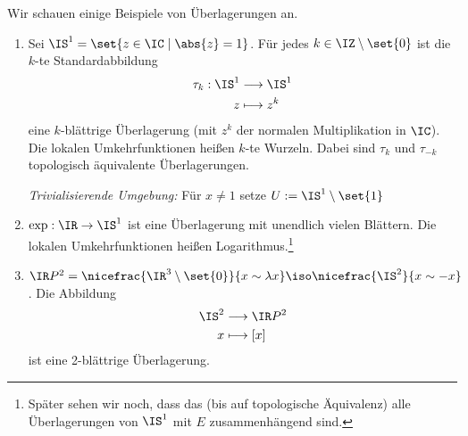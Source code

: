 \documentclass[language=ngerman]{TemplateLecture} %
\begin{document}
\begin{example}
    Wir schauen einige Beispiele von Überlagerungen an.
    \begin{enumerate}[$(a)$]
        \item Sei $\IS^1 = \set{z \in \IC \mid \abs{z} = 1}$. Für jedes $k \in \IZ \setminus \set{0}$ ist die $k$-te Standardabbildung
        \begin{align*}
            \tau_k: \IS^1 &\longrightarrow \IS^1\\
            z &\longmapsto z^k
        \end{align*}
        eine $k$-blättrige Überlagerung (mit $z^k$ der normalen Multiplikation in $\IC$). Die lokalen Umkehrfunktionen heißen $k$-te Wurzeln. Dabei sind $\tau_k$ und $\tau_{-k}$ topologisch äquivalente Überlagerungen.

        \emph{Trivialisierende Umgebung:} Für $x \neq 1$ setze $U:= \IS^1 \setminus \set{1}$
        \item $\exp: \IR \to \IS^1$ ist eine Überlagerung mit unendlich vielen Blättern. Die lokalen Umkehrfunktionen heißen Logarithmus.\footnote{Später sehen wir noch, dass das (bis auf topologische Äquivalenz) alle Überlagerungen von $\IS^1$ mit $E$ zusammenhängend sind.}
        \item $\IR P^2 = \nicefrac{\IR^3 \setminus \set{0}}{x \sim \lambda x} \iso \nicefrac{\IS^2}{x \sim -x}$. Die Abbildung 
        \begin{align*}
            \IS^2 &\longrightarrow \IR P^2 \\ 
            x &\longmapsto [x]
        \end{align*}
        ist eine 2-blättrige Überlagerung.


\end{enumerate}
\end{example}
\end{document}
